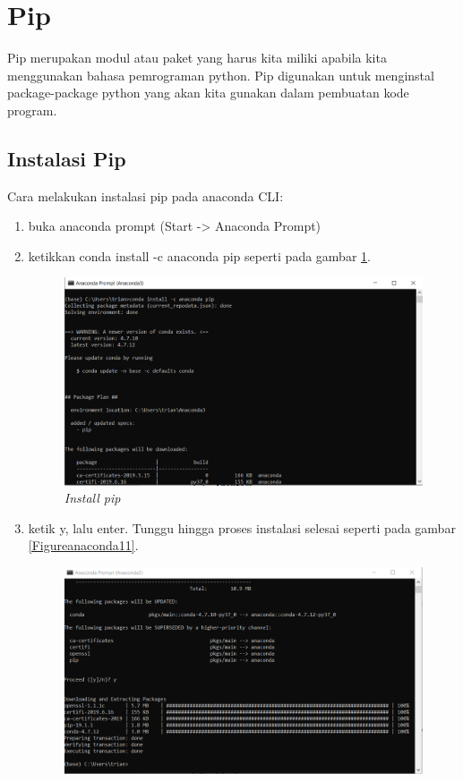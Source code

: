 \section{Pip}
Pip merupakan modul atau paket yang harus kita miliki apabila kita menggunakan bahasa pemrograman python. Pip digunakan untuk menginstal package-package python yang akan kita gunakan dalam pembuatan kode program.
\subsection{Instalasi Pip}
Cara melakukan instalasi pip pada anaconda CLI: 
\begin{enumerate}
\item buka anaconda prompt (Start -> Anaconda Prompt)
\item ketikkan conda install -c anaconda pip seperti pada gambar \ref{Figureanaconda10}.
\begin{figure}[H]
    \centering
    \includegraphics[scale=0.4]{figures/installpip}
    \caption{\textit{Install pip}}
    \label{Figureanaconda10}
\end{figure}
\item ketik y, lalu enter. Tunggu hingga proses instalasi selesai seperti pada gambar \ref{Figureanaconda11}.
\begin{figure}[H]
    \centering
    \includegraphics[scale=0.4]{figures/pipselesai}

\end{figure}
\end{enumerate}
